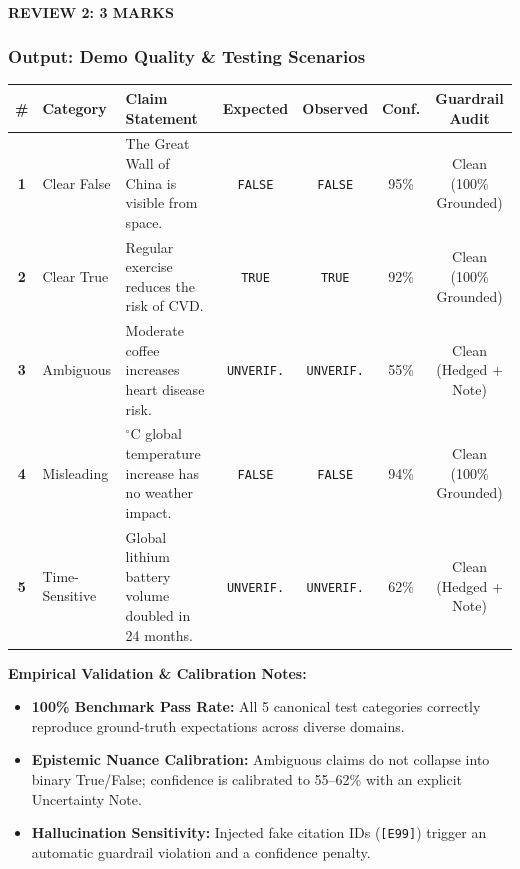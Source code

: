\documentclass[aspectratio=169, 10pt]{beamer}
\begin{document}
\begin{frame}
    \framesubtitle{REVIEW 2: 3 MARKS}
    \frametitle{Output: Demo Quality \& Testing Scenarios}
    \vspace{-0.15cm}
    \setlength{\tabcolsep}{3.5pt}
    \renewcommand{\arraystretch}{1.12}
    \scriptsize
    \noindent
    \begin{tabularx}{\textwidth}{c l >{\raggedright\arraybackslash}X c c c c}
        \toprule
        \rowcolor{HeaderBg}
        \textbf{\#} & \textbf{Category} & \textbf{Claim Statement} & \textbf{Expected} & \textbf{Observed} & \textbf{Conf.} & \textbf{Guardrail Audit} \\
        \midrule
        \textbf{1} & Clear False & The Great Wall of China is visible from space. & \texttt{FALSE} & \texttt{FALSE} & 95\% & Clean (100\% Grounded) \\
        \rowcolor{RowAlt}
        \textbf{2} & Clear True & Regular exercise reduces the risk of CVD. & \texttt{TRUE} & \texttt{TRUE} & 92\% & Clean (100\% Grounded) \\
        \textbf{3} & Ambiguous & Moderate coffee increases heart disease risk. & \texttt{UNVERIF.} & \texttt{UNVERIF.} & 55\% & Clean (Hedged + Note) \\
        \rowcolor{RowAlt}
        \textbf{4} & Misleading & 1.5$^\circ$C global temperature increase has no weather impact. & \texttt{FALSE} & \texttt{FALSE} & 94\% & Clean (100\% Grounded) \\
        \textbf{5} & Time-Sensitive & Global lithium battery volume doubled in 24 months. & \texttt{UNVERIF.} & \texttt{UNVERIF.} & 62\% & Clean (Hedged + Note) \\
        \bottomrule
    \end{tabularx}
    
    \vspace{0.2cm}
    {\small\textbf{\color{NavyDark}Empirical Validation \& Calibration Notes:}}
    \vspace{0.08cm}
    \begin{itemize}\setlength\itemsep{0.08cm}
        \item \textbf{100\% Benchmark Pass Rate:} All 5 canonical test categories correctly reproduce ground-truth expectations across diverse domains.
        \item \textbf{Epistemic Nuance Calibration:} Ambiguous claims do not collapse into binary True/False; confidence is calibrated to 55--62\% with an explicit Uncertainty Note.
        \item \textbf{Hallucination Sensitivity:} Injected fake citation IDs (\texttt{[E99]}) trigger an automatic guardrail violation and a confidence penalty.
    \end{itemize}
\end{frame}
\end{document}
